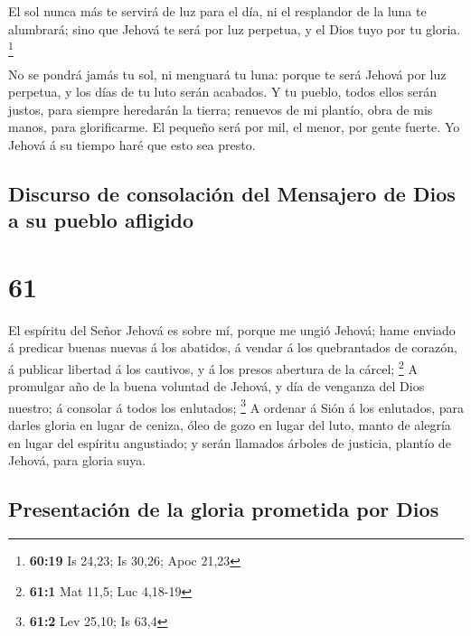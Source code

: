  El sol nunca más te servirá de luz para el día, ni el
resplandor de la luna te alumbrará; sino que Jehová te será por luz
perpetua, y el Dios tuyo por tu gloria. \footnote{\textbf{60:19} Is
  24,23; Is 30,26; Apoc 21,23}

 No se pondrá jamás tu sol, ni menguará tu luna: porque te
será Jehová por luz perpetua, y los días de tu luto serán acabados.
 Y tu pueblo, todos ellos serán justos, para siempre
heredarán la tierra; renuevos de mi plantío, obra de mis manos, para
glorificarme.  El pequeño será por mil, el menor, por gente
fuerte. Yo Jehová á su tiempo haré que esto sea presto.

\hypertarget{discurso-de-consolaciuxf3n-del-mensajero-de-dios-a-su-pueblo-afligido}{%
\subsection{Discurso de consolación del Mensajero de Dios a su pueblo
afligido}\label{discurso-de-consolaciuxf3n-del-mensajero-de-dios-a-su-pueblo-afligido}}

\hypertarget{section-60}{%
\section{61}\label{section-60}}

 El espíritu del Señor Jehová es sobre mí, porque me ungió
Jehová; hame enviado á predicar buenas nuevas á los abatidos, á vendar á
los quebrantados de corazón, á publicar libertad á los cautivos, y á los
presos abertura de la cárcel; \footnote{\textbf{61:1} Mat 11,5; Luc
  4,18-19}  A promulgar año de la buena voluntad de Jehová,
y día de venganza del Dios nuestro; á consolar á todos los enlutados;
\footnote{\textbf{61:2} Lev 25,10; Is 63,4}  A ordenar á
Sión á los enlutados, para darles gloria en lugar de ceniza, óleo de
gozo en lugar del luto, manto de alegría en lugar del espíritu
angustiado; y serán llamados árboles de justicia, plantío de Jehová,
para gloria suya.

\hypertarget{presentaciuxf3n-de-la-gloria-prometida-por-dios}{%
\subsection{Presentación de la gloria prometida por
Dios}\label{presentaciuxf3n-de-la-gloria-prometida-por-dios}}

